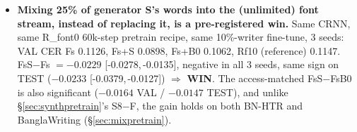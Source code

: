 \documentclass[10.5pt,a4paper]{article}
\newcommand{\ci}[2]{{\footnotesize[#1,\,#2]}}
\begin{document}
\begin{itemize}
  F 0.169, B0 0.161, S1 0.155, S8 0.154. S8$-$F $=-0.0154$ \ci{-0.0227}{+0.0029}, 3/3 seeds negative but the pooled CI
  crosses 0 $\Rightarrow$ \textbf{not a win}; the access-matched S8$-$B0 $=-0.0075$ \ci{-0.0109}{-0.0040} is significant
  (same sign on TEST). S's advantage over F holds on BN-HTR ($-0.022$, significant) but not BW ($+0.012$, n.s.). Every
  6,000-word matched corpus is far short of the unmatched font-stream reference (0.115) (\S\ref{sec:synthpretrain}).
\item \textbf{Mixing 25\% of generator S's words into the (unlimited) font stream, instead of replacing it, is a
  pre-registered win.} Same CRNN, same R\_font0 60k-step pretrain recipe, same 10\%-writer fine-tune, 3 seeds: VAL CER
  Fs 0.1126, Fs+S 0.0898, Fs+B0 0.1062, Rf10 (reference) 0.1147. FsS$-$Fs $=-0.0229$ \ci{-0.0278}{-0.0135}, negative in
  all 3 seeds, same sign on TEST ($-0.0233$ \ci{-0.0379}{-0.0127}) $\Rightarrow$ \textbf{WIN}. The access-matched
  FsS$-$FsB0 is also significant ($-0.0164$ VAL / $-0.0147$ TEST), and unlike \S\ref{sec:synthpretrain}'s S8$-$F, the gain
  holds on both BN-HTR and BanglaWriting (\S\ref{sec:mixpretrain}).
\end{itemize}
\end{document}
